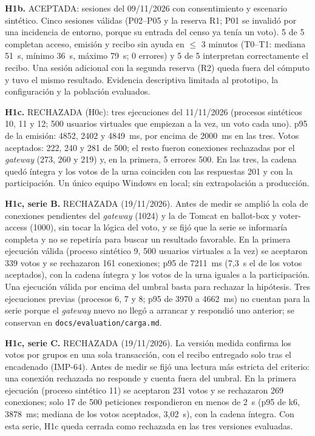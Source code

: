 \textbf{H1b.} ACEPTADA: sesiones del 09/11/2026 con consentimiento y escenario sintético. Cinco sesiones válidas (P02--P05 y la reserva R1; P01 se invalidó por una incidencia de entorno, porque su entrada del censo ya tenía un voto). 5 de 5 completan acceso, emisión y recibo sin ayuda en $\leq$ 3 minutos (T0--T1: mediana 51~s, mínimo 36~s, máximo 79~s; 0 errores) y 5 de 5 interpretan correctamente el recibo. Una sesión adicional con la segunda reserva (R2) queda fuera del cómputo y tuvo el mismo resultado. Evidencia descriptiva limitada al prototipo, la configuración y la población evaluados.

\textbf{H1c.} RECHAZADA (H0c): tres ejecuciones del 11/11/2026 (procesos sintéticos 10, 11 y 12; 500 usuarios virtuales que empiezan a la vez, un voto cada uno). p95 de la emisión: 4852, 2402 y 4849~ms, por encima de 2000~ms en las tres. Votos aceptados: 222, 240 y 281 de 500; el resto fueron conexiones rechazadas por el \emph{gateway} (273, 260 y 219) y, en la primera, 5 errores 500. En las tres, la cadena quedó íntegra y los votos de la urna coinciden con las respuestas 201 y con la participación. Un único equipo Windows en local; sin extrapolación a producción.

\textbf{H1c, serie B.} RECHAZADA (19/11/2026). Antes de medir se amplió la cola de conexiones pendientes del \emph{gateway} (1024) y la de Tomcat en ballot-box y voter-access (1000), sin tocar la lógica del voto, y se fijó que la serie se informaría completa y no se repetiría para buscar un resultado favorable. En la primera ejecución válida (proceso sintético 9, 500 usuarios virtuales a la vez) se aceptaron 339 votos y se rechazaron 161 conexiones; p95 de 7211~ms (7,3~s el de los votos aceptados), con la cadena íntegra y los votos de la urna iguales a la participación. Una ejecución válida por encima del umbral basta para rechazar la hipótesis. Tres ejecuciones previas (procesos 6, 7 y 8; p95 de 3970 a 4662~ms) no cuentan para la serie porque el \emph{gateway} nuevo no llegó a arrancar y respondió uno anterior; se conservan en \texttt{docs/evaluation/carga.md}.

\textbf{H1c, serie C.} RECHAZADA (19/11/2026). La versión medida confirma los votos por grupos en una sola transacción, con el recibo entregado solo tras el encadenado (IMP-64). Antes de medir se fijó una lectura más estricta del criterio: una conexión rechazada no responde y cuenta fuera del umbral. En la primera ejecución (proceso sintético 11) se aceptaron 231 votos y se rechazaron 269 conexiones; solo 17 de 500 peticiones respondieron en menos de 2~s (p95 de k6, 3878~ms; mediana de los votos aceptados, 3,02~s), con la cadena íntegra. Con esta serie, H1c queda cerrada como rechazada en las tres versiones evaluadas.

